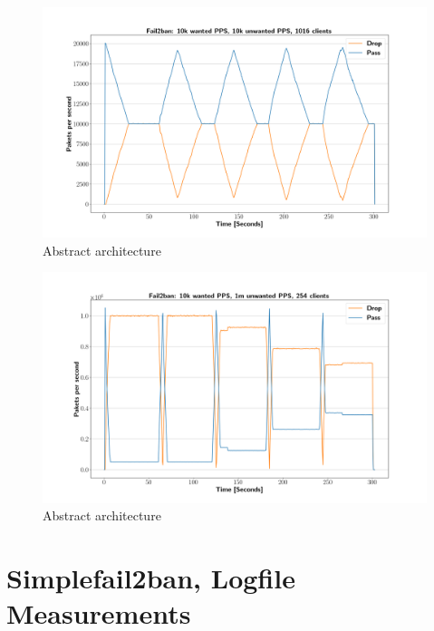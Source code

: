 \begin{figure}[p]
	\label{fig:fail2ban:10k}
    \centerline{\includegraphics[width=1.2\textwidth]{images/fail2ban_v10k_iv10k_c1016.png}}
    \caption[Fail2Ban Replication Measurements 1]{Abstract architecture }
\end{figure}

\begin{figure}[p]
	\label{fig:fail2ban:1m}
    \centerline{\includegraphics[width=1.2\textwidth]{images/fail2ban_v50k_iv1m_c254.png}}
    \caption[IPC Architecture]{Abstract architecture }
\end{figure}

\section{Simplefail2ban, Logfile Measurements}

